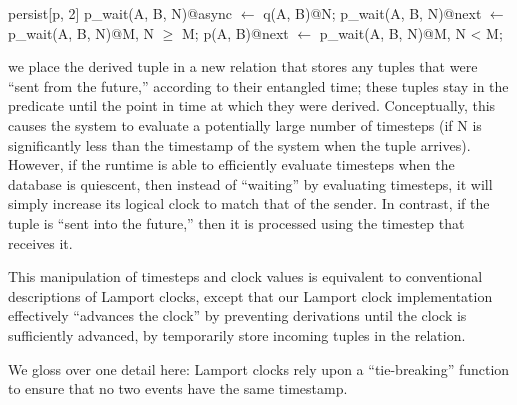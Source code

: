 \begin{Dedalus}
persist[p, 2]
p\_wait(A, B, N)@async \(\leftarrow\) q(A, B)@N;
p\_wait(A, B, N)@next \(\leftarrow\) p\_wait(A, B, N)@M, N \(\ge\) M;
p(A, B)@next \(\leftarrow\) p\_wait(A, B, N)@M, N < M;
\end{Dedalus}

\noindent we place the derived tuple in a new relation  that
stores any tuples that were ``sent from the future,'' according to their
entangled time; these tuples stay in the  predicate until the
point in time at which they were derived.  Conceptually, this causes the system
to evaluate a potentially large number of timesteps (if N is significantly less
than the timestamp of the system when the tuple arrives).  However, if the
runtime is able to efficiently evaluate timesteps when the database is
quiescent, then instead of ``waiting'' by evaluating timesteps, it will simply
increase its logical clock to match that of the sender.   In contrast, if the tuple is ``sent into the future,'' then it is
processed using the timestep that receives it.

This manipulation of timesteps and clock values is equivalent to conventional
descriptions of Lamport clocks, except that our Lamport clock implementation
effectively ``advances the clock'' by preventing derivations until the clock is
sufficiently advanced, by temporarily store incoming tuples in the
 relation.

We gloss over one detail here: Lamport clocks rely upon a ``tie-breaking''
function to ensure that no two events have the same timestamp.  
